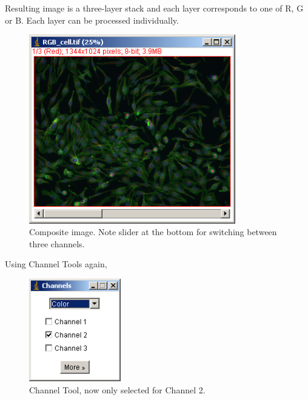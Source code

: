 \begin{indentexercise}{1}
Resulting image is a three-layer stack and each layer corresponds to one
of R, G or B. Each layer can be processed individually. 
\begin{figure}[H]
\begin{center}
\includegraphics[width=9cm]{fig/CMCIBasicCourse201102-img16.png}
\caption{ Composite image. Note slider at the bottom for switching between three channels.}
\label{fig:img16}
\end{center}
\end{figure}

Using Channel Tools again,
\begin{figure}[H]
\begin{center}
\includegraphics[width=4cm]{fig/CMCIBasicCourse201102-img17.png}
\caption{ Channel Tool, now only selected for Channel 2.}
\label{fig:img17}
\end{center}
\end{figure}


\end{indentexercise}
